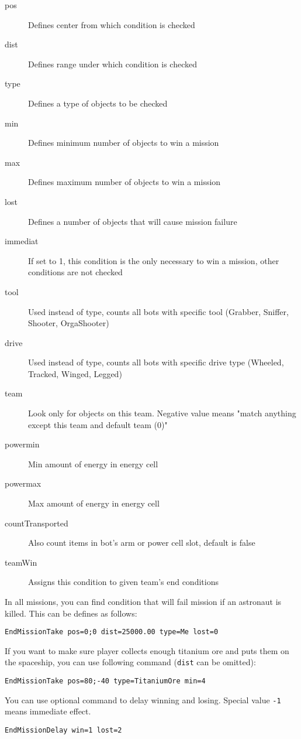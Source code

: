 \begin{description}
    \item[pos] Defines center from which condition is checked
    \item[dist] Defines range under which condition is checked
    \item[type] Defines a type of objects to be checked
    \item[min] Defines minimum number of objects to win a mission
    \item[max] Defines maximum number of objects to win a mission
    \item[lost] Defines a number of objects that will cause mission failure
    \item[immediat] If set to 1, this condition is the only necessary to win a mission, other conditions are not checked
    \item[tool] Used instead of type, counts all bots with specific tool (Grabber, Sniffer, Shooter, OrgaShooter)
    \item[drive] Used instead of type, counts all bots with specific drive type (Wheeled, Tracked, Winged, Legged)
    \item[team] Look only for objects on this team. Negative value means "match anything except this team and default team (0)"
    \item[powermin] Min amount of energy in energy cell
    \item[powermax] Max amount of energy in energy cell
    \item[countTransported] Also count items in bot's arm or power cell slot, default is false
    \item[teamWin] Assigns this condition to given team's end conditions 
\end{description}

In all missions, you can find condition that will fail mission if an astronaut is killed. This can be defines as follows:

\begin{lstlisting}[style=scene]
EndMissionTake pos=0;0 dist=25000.00 type=Me lost=0
\end{lstlisting}

If you want to make sure player collects enough titanium ore and puts them on the spaceship, you can use following command (\texttt{dist} can be omitted):

\begin{lstlisting}[style=scene]
EndMissionTake pos=80;-40 type=TitaniumOre min=4
\end{lstlisting}

You can use optional command to delay winning and losing. Special value \texttt{-1} means immediate effect.

\begin{lstlisting}[style=scene]
EndMissionDelay win=1 lost=2
\end{lstlisting}
